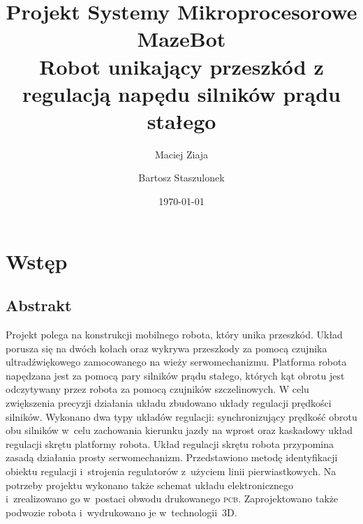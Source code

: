 \documentclass[11pt]{article}
\author{Maciej Ziaja \and Bartosz Staszulonek}
\date{\today}
\begin{document}
\title{
  Projekt Systemy Mikroprocesorowe \\
  \large MazeBot \\
    Robot unikający przeszkód z regulacją napędu silników prądu stałego}

\maketitle

\newpage
{}
\tableofcontents
\newpage

\section{Wstęp}

\subsection{Abstrakt}
Projekt polega na konstrukcji mobilnego robota, który unika przeszkód.
Układ porusza się na dwóch kołach oraz wykrywa przeszkody za pomocą czujnika ultradźwiękowego zamocowanego na wieży serwomechanizmu.
Platforma robota napędzana jest za pomocą pary silników prądu stałego, których kąt obrotu jest odczytywany przez robota za pomocą czujników szczelinowych.
W celu zwiększenia precyzji działania układu zbudowano układy regulacji prędkości silników.
Wykonano dwa typy układów regulacji: synchronizujący prędkość obrotu obu silników w~celu zachowania kierunku jazdy na wprost oraz kaskadowy układ regulacji skrętu platformy robota.
Układ regulacji skrętu robota przypomina zasadą działania prosty serwomechanizm.
Przedstawiono metodę identyfikacji obiektu regulacji i~strojenia regulatorów z~użyciem linii pierwiastkowych.
Na potrzeby projektu wykonano także schemat układu elektronicznego i~zrealizowano go w~postaci obwodu drukowanego \textsc{pcb}.
Zaprojektowano także podwozie robota i~wydrukowano je w~technologii~3D.
\end{document}
